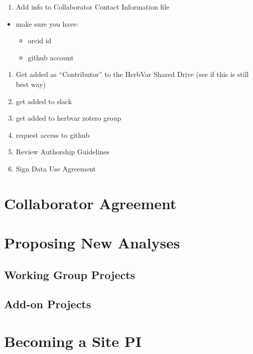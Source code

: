 \documentclass[
  letterpaper,
  DIV=11,
  numbers=noendperiod]{scrreprt}
\providecommand{\tightlist}{%
  \setlength{\itemsep}{0pt}\setlength{\parskip}{0pt}}\usepackage{longtable,booktabs,array}
\begin{document}
\begin{enumerate}
\def\labelenumi{\arabic{enumi}.}
\tightlist
\item
  Add info to Collaborator Contact Information file
\end{enumerate}

\begin{itemize}
\tightlist
\item
  make sure you have:

  \begin{itemize}
  \tightlist
  \item
    orcid id
  \item
    github account
  \end{itemize}
\end{itemize}

\begin{enumerate}
\def\labelenumi{\arabic{enumi}.}
\tightlist
\item
  Get added as ``Contributor'' to the HerbVar Shared Drive (see if this
  is still best way)
\item
  get added to slack
\item
  get added to herbvar zotero group
\item
  request access to github
\item
  Review Authorship Guidelines
\item
  Sign Data Use Agreement
\end{enumerate}

\chapter{Collaborator Agreement}\label{collaborator-agreement}

\chapter{Proposing New Analyses}\label{proposing-new-analyses}

\section{Working Group Projects}\label{working-group-projects}

\section{Add-on Projects}\label{add-on-projects}

\chapter{Becoming a Site PI}\label{becoming-a-site-pi}
\end{document}
